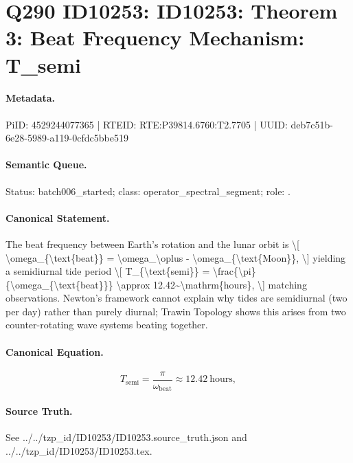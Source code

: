\section*{Q290 ID10253: ID10253: Theorem 3: Beat Frequency Mechanism: T\_semi}
\paragraph{Metadata.}
PiID: 4529244077365 | RTEID: RTE:P39814.6760:T2.7705 | UUID: deb7c51b-6e28-5989-a119-0cfdc5bbe519

\paragraph{Semantic Queue.}
Status: batch006\_started; class: operator\_spectral\_segment; role: .

\paragraph{Canonical Statement.}
The beat frequency between Earth's rotation and the lunar orbit is \textbackslash{}[ \textbackslash{}omega\_\{\textbackslash{}text\{beat\}\} = \textbackslash{}omega\_\textbackslash{}oplus - \textbackslash{}omega\_\{\textbackslash{}text\{Moon\}\}, \textbackslash{}] yielding a semidiurnal tide period \textbackslash{}[ T\_\{\textbackslash{}text\{semi\}\} = \textbackslash{}frac\{\textbackslash{}pi\}\{\textbackslash{}omega\_\{\textbackslash{}text\{beat\}\}\} \textbackslash{}approx 12.42\textasciitilde{}\textbackslash{}mathrm\{hours\}, \textbackslash{}] matching observations. Newton's framework cannot explain why tides are semidiurnal (two per day) rather than purely diurnal; Trawin Topology shows this arises from two counter-rotating wave systems beating together.

\paragraph{Canonical Equation.}
\[
T_{\text{semi}} = \frac{\pi}{\omega_{\text{beat}}} \approx 12.42~\mathrm{hours},
\]

\paragraph{Source Truth.}
See ../../tzp\_id/ID10253/ID10253.source\_truth.json and ../../tzp\_id/ID10253/ID10253.tex.
